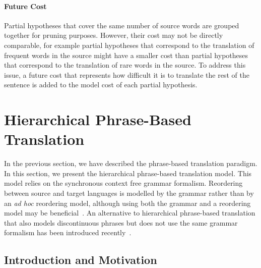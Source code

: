 \paragraph{Future Cost}

Partial hypotheses that cover the same number of source
words are grouped together for pruning purposes. However,
their cost may not be directly comparable, for example
partial hypotheses that correspond to the translation of frequent
words in the source might have a smaller cost than partial hypotheses
that correspond to the translation of rare words in the source.
To address this issue, a future cost that represents how difficult it is
to translate the rest of the sentence is added to the model cost of each
partial hypothesis.

\section{Hierarchical Phrase-Based Translation}
\label{sec:hierarchicalPhraseBasedTranslation}


In the previous section, we have described the
phrase-based translation paradigm.
In this section, we present the
hierarchical phrase-based translation
model. This model relies on the synchronous
context free grammar formalism. Reordering
between source and target languages is modelled
by the grammar rather than by an \emph{ad hoc}
reordering model, although using both the grammar
and a reordering model may be
beneficial~\citep{huck-EtAl:2013:WMT}.
An alternative to hierarchical phrase-based
translation that also models discontinuous
phrases but does not use the same grammar
formalism has been introduced
recently~\citep{galley-manning:2010:NAACLHLT}.

\subsection{Introduction and Motivation}
\label{sec:hierintro}

